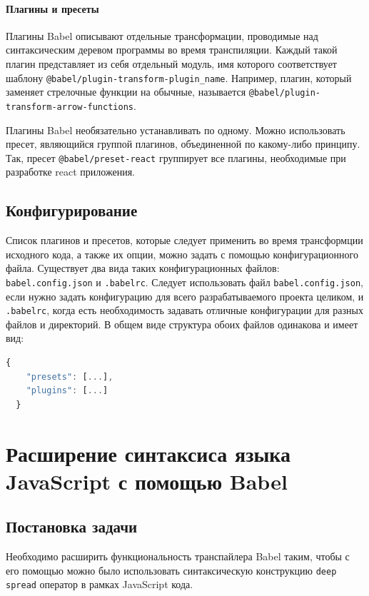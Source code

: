 \documentclass[14pt, a4paper]{article}
\def\code#1{\texttt{#1}} %
\begin{document}
\paragraph{Плагины и пресеты} \mbox{}

Плагины Babel описывают отдельные трансформации, проводимые над синтаксическим деревом программы во
время транспиляции. Каждый такой плагин представляет из себя отдельный модуль, имя которого
соответствует шаблону \code{@babel/plugin-transform-plugin\_name}. Например, плагин, который заменяет
стрелочные функции на обычные, называется \linebreak \code{@babel/plugin-transform-arrow-functions}.

Плагины Babel необязательно устанавливать по одному. Можно использовать пресет, являющийся группой
плагинов, объединенной по какому-либо принципу. Так, пресет \code{@babel/preset-react} группирует
все плагины, необходимые при разработке react приложения.

\subsection{Конфигурирование}
Список плагинов и пресетов, которые следует применить во время трансформции исходного кода, а также
их опции, можно задать с помощью конфигурационного файла. Существует два вида таких конфигурационных
файлов: \code{babel.config.json} и \code{.babelrc}. Следует использовать файл \code{babel.config.json},
если нужно задать конфигурацию для всего разрабатываемого проекта целиком, и \code{.babelrc}, когда
есть необходимость задавать отличные конфигурации для разных файлов и директорий. В общем виде
структура обоих файлов одинакова и имеет вид:

\begin{lstlisting}[language=JavaScript]
  {
    "presets": [...],
    "plugins": [...]
  }
\end{lstlisting}

\pagebreak

\section{Расширение синтаксиса языка JavaScript с помощью Babel}
\subsection{Постановка задачи}
Необходимо расширить функциональность транспайлера Babel таким, чтобы с его помощью можно было использовать
синтаксическую конструкцию \code{deep spread} оператор в рамках JavaScript кода.
\end{document}
